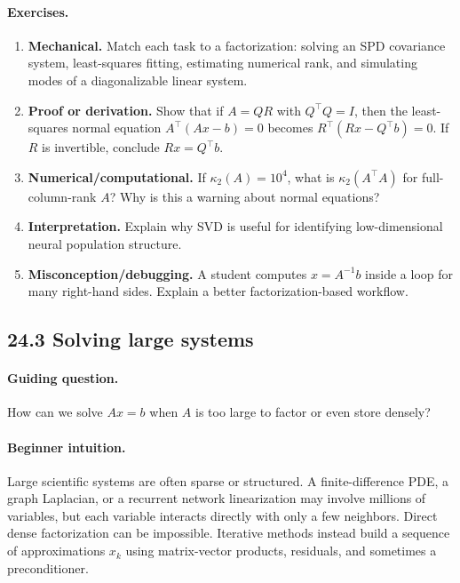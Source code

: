 \paragraph{Exercises.}
\begin{enumerate}[label=\textbf{24.2.\arabic*.}, leftmargin=*]
\item \textbf{Mechanical.} Match each task to a factorization: solving an SPD covariance system, least-squares fitting, estimating numerical rank, and simulating modes of a diagonalizable linear system.
\item \textbf{Proof or derivation.} Show that if \(A=QR\) with \(Q^\top Q=I\), then the least-squares normal equation \(A^\top(Ax-b)=0\) becomes \(R^\top(Rx-Q^\top b)=0\). If \(R\) is invertible, conclude \(Rx=Q^\top b\).
\item \textbf{Numerical/computational.} If \(\kappa_2(A)=10^4\), what is \(\kappa_2(A^\top A)\) for full-column-rank \(A\)? Why is this a warning about normal equations?
\item \textbf{Interpretation.} Explain why SVD is useful for identifying low-dimensional neural population structure.
\item \textbf{Misconception/debugging.} A student computes \(x=A^{-1}b\) inside a loop for many right-hand sides. Explain a better factorization-based workflow.
\end{enumerate}

\subsection{24.3 Solving large systems}

\paragraph{Guiding question.}
How can we solve \(Ax=b\) when \(A\) is too large to factor or even store densely?

\paragraph{Beginner intuition.}
Large scientific systems are often sparse or structured. A finite-difference PDE, a graph Laplacian, or a recurrent network linearization may involve millions of variables, but each variable interacts directly with only a few neighbors. Direct dense factorization can be impossible. Iterative methods instead build a sequence of approximations \(x_k\) using matrix-vector products, residuals, and sometimes a preconditioner.

